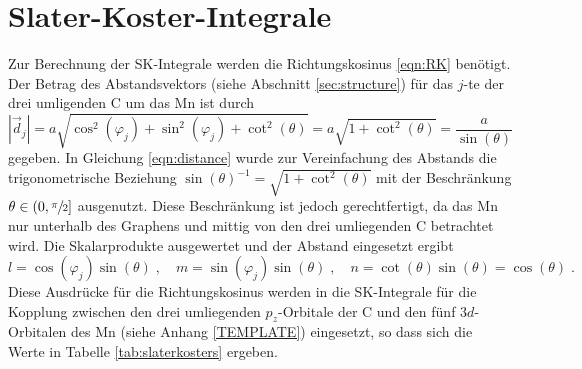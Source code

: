 \section{Slater-Koster-Integrale}
\label{sec:slaterkostercalc}
Zur Berechnung der SK-Integrale werden die Richtungskosinus \eqref{eqn:RK} benötigt.
Der Betrag des Abstandsvektors (siehe Abschnitt \ref{sec:structure}) für das $j$-te der drei umligenden C um das Mn ist durch 
\begin{equation}
    \left | \vec{d}_j  \right | = a \sqrt{\cos^2(\varphi_j) + \sin^2(\varphi_j) + \cot^2(\theta)} = a \sqrt{1+\cot^2(\theta)} = \frac{a}{\sin(\theta)} \label{eqn:distance}
\end{equation}
gegeben.
In Gleichung \eqref{eqn:distance} wurde zur Vereinfachung des Abstands die trigonometrische Beziehung $ \sin(\theta)^{-1} = \sqrt{1+\cot^2(\theta)}$ \cite{trig} mit der Beschränkung
$\theta \in ( 0, \sfrac{\pi}{2} ] $ ausgenutzt. 
Diese Beschränkung ist jedoch gerechtfertigt, da das Mn nur unterhalb des Graphens und mittig von den drei umliegenden C betrachtet wird.
Die Skalarprodukte ausgewertet und der Abstand eingesetzt ergibt
\begin{equation*}
    l = \cos(\varphi_j) \sin(\theta) \; , \quad
    m = \sin(\varphi_j) \sin(\theta) \; , \quad
    n = \cot(\theta) \sin(\theta) = \cos(\theta) \; .
\end{equation*}
Diese Ausdrücke für die Richtungskosinus werden in die SK-Integrale für die Kopplung zwischen den drei umliegenden 
$p_z$-Orbitale der C und den fünf $3d$-Orbitalen des Mn (siehe Anhang \ref{TEMPLATE}) eingesetzt,
so dass sich die Werte in Tabelle \ref{tab:slaterkosters} ergeben.
